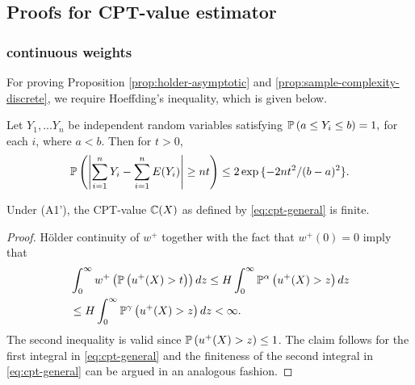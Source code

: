 \subsection{Proofs for CPT-value estimator}
\label{appendix:cpt-est}

\subsubsection{\holder continuous weights}
\label{sec:holder-proofs}
For proving Proposition \ref{prop:holder-asymptotic} and \ref{prop:sample-complexity-discrete}, we require Hoeffding's inequality, which is given below.
\begin{lemma}
Let $Y_1,...Y_n$ be independent random variables satisfying $\mathbb{P}\left( a\leq Y_i \leq b \right)= 1,$ for each $i$, where $a<b.
$ Then for $t>0$,
$$\mathbb{P}\left( \left|\sum_{i=1}^n Y_i -\sum_{i=1}^n E(Y_i)\right| \geq nt  \right) \leq 2\exp{\{-2nt^2 /(b-a)^2\}}. $$
\end{lemma}

\begin{proposition}
\label{prop:Holder-cpt-finite}
Under (A1'), the CPT-value $\mathbb{C}(X)$ as defined by \eqref{eq:cpt-general} is finite. 
\end{proposition}
\begin{proof}

H\"{o}lder continuity of $w^+$ together with the fact that $w^+(0)=0$ imply that 
\begin{align*}
&\int_0^{\infty} w^+\left(\mathbb{P}\left( u^{+}(X)>t \right)\right) dz 
\le H \int_0^{\infty} \mathbb{P}^{\alpha} \left(u^+(X)>z\right) dz\\
&\le H \int_0^{\infty} \mathbb{P}^{\gamma} \left(u^+(X)>z\right) dz 
<\infty.
\end{align*}
The second inequality is valid since $\mathbb{P}\left( u^+(X)>z \right) \leq 1$. The claim follows for the first integral in \eqref{eq:cpt-general} and the finiteness of the second integral in \eqref{eq:cpt-general} can be argued in an analogous fashion.
\end{proof}

